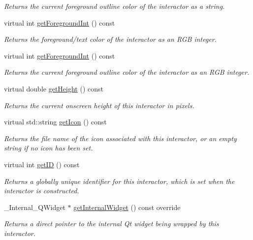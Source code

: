 \begin{DoxyCompactItemize}
\begin{DoxyCompactList}\small\item\em Returns the current foreground outline color of the interactor as a string. \end{DoxyCompactList}\item 
virtual int \mbox{\hyperlink{classGInteractor_ac3b12ab385a6ef9ae90fc879860ba726}{get\+Foreground\+Int}} () const
\begin{DoxyCompactList}\small\item\em Returns the foreground/text color of the interactor as an R\+GB integer. \end{DoxyCompactList}\item 
virtual int \mbox{\hyperlink{classGDrawingSurface_ac3b12ab385a6ef9ae90fc879860ba726}{get\+Foreground\+Int}} () const
\begin{DoxyCompactList}\small\item\em Returns the current foreground outline color of the interactor as an R\+GB integer. \end{DoxyCompactList}\item 
virtual double \mbox{\hyperlink{classGInteractor_a1e7e353362434072875264cf95629f99}{get\+Height}} () const
\begin{DoxyCompactList}\small\item\em Returns the current onscreen height of this interactor in pixels. \end{DoxyCompactList}\item 
virtual std\+::string \mbox{\hyperlink{classGInteractor_aaed62a73004939a64da6f0eb9eb64d73}{get\+Icon}} () const
\begin{DoxyCompactList}\small\item\em Returns the file name of the icon associated with this interactor, or an empty string if no icon has been set. \end{DoxyCompactList}\item 
virtual int \mbox{\hyperlink{classGInteractor_a9c9659a6c6ba66b4107ba59c95a24241}{get\+ID}} () const
\begin{DoxyCompactList}\small\item\em Returns a globally unique identifier for this interactor, which is set when the interactor is constructed. \end{DoxyCompactList}\item 
\+\_\+\+Internal\+\_\+\+Q\+Widget $\ast$ \mbox{\hyperlink{classGCanvas_a2f6b36b2517087dc90a366b5ce1f5323}{get\+Internal\+Widget}} () const override
\begin{DoxyCompactList}\small\item\em Returns a direct pointer to the internal Qt widget being wrapped by this interactor. \end{DoxyCompactList}\item 

\end{DoxyCompactItemize}
